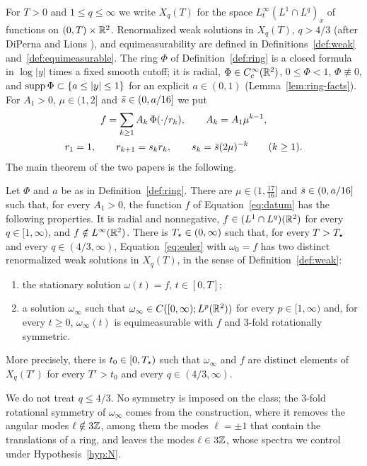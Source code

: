 For $T>0$ and $1\le q\le\infty$ we write $X_q(T)$ for the space
$L^\infty_t(L^1\cap L^q)_x$ of functions on $(0,T)\times\mathbb{R}^2$. Renormalized weak solutions in $X_q(T)$, $q>4/3$ (after
DiPerna and Lions \cite{DiPernaLions}), and equimeasurability are defined in
Definitions~\ref{def:weak} and~\ref{def:equimeasurable}. The ring $\Phi$ of
Definition~\ref{def:ring} is a closed formula in $\log|y|$ times a fixed smooth
cutoff; it is radial, $\Phi\in C_c^\infty(\mathbb{R}^2)$, $0\le\Phi<1$,
$\Phi\not\equiv0$, and $\operatorname{supp}\Phi\subset\{a\le|y|\le1\}$ for an explicit
$a\in(0,1)$ (Lemma~\ref{lem:ring-facts}). For $A_1>0$, $\mu\in(1,2]$ and
$\bar s\in(0,a/16]$ we put
\begin{equation}
\label{eq:datum}
\begin{gathered}
f=\sum_{k\ge1}A_k\,\Phi(\cdot/r_k),\qquad A_k=A_1\mu^{k-1},\\
r_1=1,\qquad r_{k+1}=s_kr_k,\qquad s_k=\bar s(2\mu)^{-k}\qquad(k\ge1).
\end{gathered}
\end{equation}
The main theorem of the two papers is the following.

\begin{theorem}
\label{thm:main}
Let $\Phi$ and $a$ be as in Definition~\ref{def:ring}. There are
$\mu\in(1,\frac{17}{16}]$ and $\bar s\in(0,a/16]$ such that, for every $A_1>0$,
the function $f$ of Equation~\eqref{eq:datum} has the following properties. It
is radial and nonnegative, $f\in (L^1\cap L^q)(\mathbb{R}^2)$ for every $q\in[1,\infty)$,
and $f\notin L^\infty(\mathbb{R}^2)$. There is $T_\star\in(0,\infty)$ such that, for
every $T>T_\star$ and every $q\in(4/3,\infty)$, Equation~\eqref{eq:euler} with
$\omega_0=f$ has two distinct renormalized weak solutions in $X_q(T)$, in the
sense of Definition~\ref{def:weak}:
\begin{enumerate}[label=\textup{(\roman*)}]
\item the stationary solution $\omega(t)=f$, $t\in[0,T]$;
\item a solution $\omega_\infty$ such that
  $\omega_\infty\in C([0,\infty);L^p(\mathbb{R}^2))$ for every $p\in[1,\infty)$ and,
  for every $t\ge0$, $\omega_\infty(t)$ is equimeasurable with $f$ and
  $3$-fold rotationally symmetric.
\end{enumerate}
More precisely, there is $t_0\in[0,T_\star)$ such that $\omega_\infty$ and $f$
are distinct elements of $X_q(T')$ for every $T'>t_0$ and every
$q\in(4/3,\infty)$.
\end{theorem}

We do not treat $q\le4/3$. No symmetry is
imposed on the class; the $3$-fold rotational symmetry of $\omega_\infty$ comes from the
construction, where it removes the angular modes $\ell\notin3\mathbb{Z}$, among them the
modes $\ell=\pm1$ that contain the translations of a ring, and leaves the
modes $\ell\in3\mathbb{Z}$, whose spectra we control under Hypothesis~\ref{hyp:N}.


